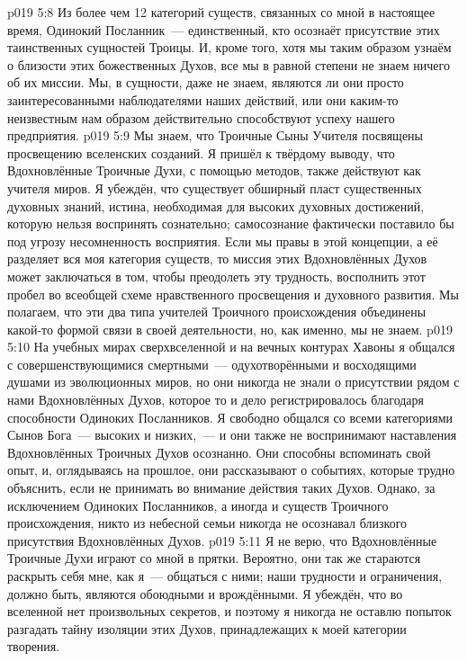 \vs p019 5:8 \pc Из более чем 12 категорий существ, связанных со мной в настоящее время, Одинокий Посланник~--- единственный, кто осознаёт присутствие этих таинственных сущностей Троицы. И, кроме того, хотя мы таким образом узнаём о близости этих божественных Духов, все мы в равной степени не знаем ничего об их миссии. Мы, в сущности, даже не знаем, являются ли они просто заинтересованными наблюдателями наших действий, или они каким\hyp{}то неизвестным нам образом действительно способствуют успеху нашего предприятия.
\vs p019 5:9 Мы знаем, что Троичные Сыны Учителя посвящены  просвещению вселенских созданий. Я пришёл к твёрдому выводу, что Вдохновлённые Троичные Духи, с помощью  методов, также действуют как учителя миров. Я убеждён, что существует обширный пласт существенных духовных знаний, истина, необходимая для высоких духовных достижений, которую нельзя воспринять сознательно; самосознание фактически поставило бы под угрозу несомненность восприятия. Если мы правы в этой концепции, а её разделяет вся моя категория существ, то миссия этих Вдохновлённых Духов может заключаться в том, чтобы преодолеть эту трудность, восполнить этот пробел во всеобщей схеме нравственного просвещения и духовного развития. Мы полагаем, что эти два типа учителей Троичного происхождения объединены какой\hyp{}то формой связи в своей деятельности, но, как именно, мы не знаем.
\vs p019 5:10 На учебных мирах сверхвселенной и на вечных контурах Хавоны я общался с совершенствующимися смертными~--- одухотворёнными и восходящими душами из эволюционных миров, но они никогда не знали о присутствии рядом с нами Вдохновлённых Духов, которое то и дело регистрировалось благодаря способности Одиноких Посланников. Я свободно общался со всеми категориями Сынов Бога~--- высоких и низких,~--- и они также не воспринимают наставления Вдохновлённых Троичных Духов осознанно. Они способны вспоминать свой опыт, и, оглядываясь на прошлое, они рассказывают о событиях, которые трудно объяснить, если не принимать во внимание действия таких Духов. Однако, за исключением Одиноких Посланников, а иногда и существ Троичного происхождения, никто из небесной семьи никогда не осознавал близкого присутствия Вдохновлённых Духов.
\vs p019 5:11 Я не верю, что Вдохновлённые Троичные Духи играют со мной в прятки. Вероятно, они так же стараются раскрыть себя мне, как я~--- общаться с ними; наши трудности и ограничения, должно быть, являются обоюдными и врождёнными. Я убеждён, что во вселенной нет произвольных секретов, и поэтому я никогда не оставлю попыток разгадать тайну изоляции этих Духов, принадлежащих к моей категории творения.
